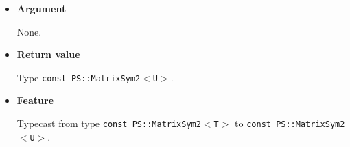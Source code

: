 \begin{itemize}

\item{{\bf Argument}}

  None.

\item{{\bf Return value}}

  Type \texttt{const PS::MatrixSym2$<$U$>$}.

\item{{\bf Feature}}

  Typecast from type \texttt{const PS::MatrixSym2$<$T$>$} to \texttt{const
  PS::MatrixSym2$<$U$>$}.

\end{itemize}

